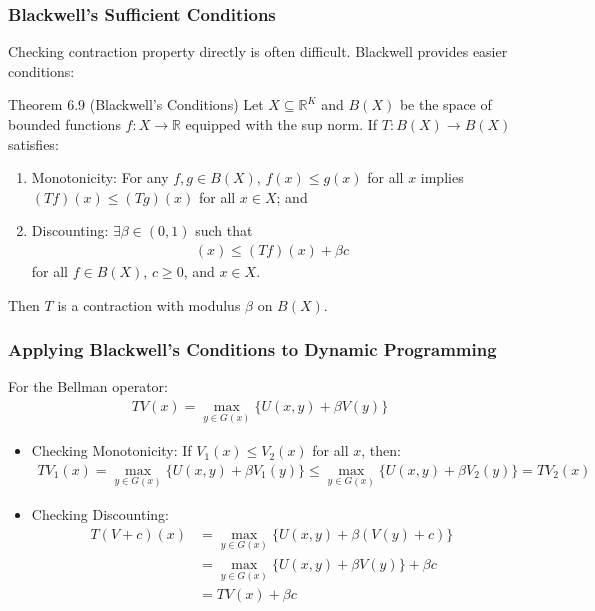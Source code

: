 \documentclass[9pt,aspectratio=169]{beamer}
\begin{document}
\begin{frame}
\frametitle{Blackwell's Sufficient Conditions}

Checking contraction property directly is often difficult. Blackwell provides easier conditions:

\begin{block}{Theorem 6.9 (Blackwell's Conditions)}
    Let $X \subseteq \mathbb{R}^K$ and $B(X)$ be the space of bounded
    functions $f: X \to \mathbb{R}$ equipped with the sup norm. If $T: B(X)
    \to B(X)$ satisfies:
\begin{enumerate}
    \item Monotonicity: For any $f, g \in B(X)$, $f(x) \leq g(x)$ for all $x$
    implies $(Tf)(x) \leq (Tg)(x)$ for all $x \in X$; and
    \item Discounting: $\exists \beta \in (0,1)$ such that
    \begin{align*}
        [T(f + c)](x) \leq (Tf)(x) + \beta c
    \end{align*}
    for all $f \in B(X)$, $c \geq 0$, and $x \in X$.
\end{enumerate}
Then $T$ is a contraction with modulus $\beta$ on $B(X)$.
\end{block}

\end{frame}

\begin{frame}
\frametitle{Applying Blackwell's Conditions to Dynamic Programming}

For the Bellman operator:
\begin{align*}
TV(x) = \max_{y \in G(x)} \{U(x,y) + \beta V(y)\}
\end{align*}

\begin{itemize}
    \item Checking Monotonicity: If $V_1(x) \leq V_2(x)$ for all $x$, then:
    \begin{align*}
        TV_1(x) = \max_{y \in G(x)} \{U(x,y) + \beta V_1(y)\} \leq \max_{y
          \in G(x)} \{U(x,y) + \beta V_2(y)\} = TV_2(x) 
    \end{align*}
    \item Checking Discounting:
    \begin{align*}
        T(V + c)(x) &= \max_{y \in G(x)} \{U(x,y) + \beta(V(y) + c)\}\\
        &= \max_{y \in G(x)} \{U(x,y) + \beta V(y)\} + \beta c\\
        &= TV(x) + \beta c
    \end{align*}
\end{itemize}

\end{frame}
\end{document}
